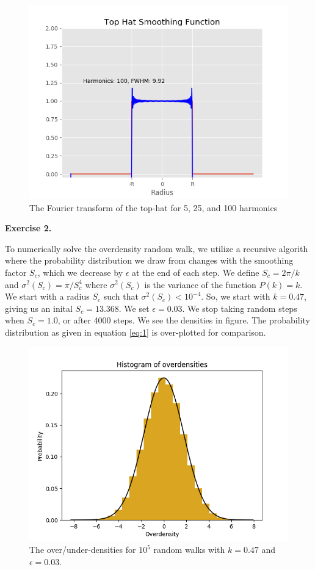 \documentclass[a4paper]{article}
\begin{document}
\begin{figure}[h]
\centering
\includegraphics[scale=0.45]{exercise1_100harm}
\caption{The Fourier transform of the top-hat for 5, 25, and 100 harmonics}
\label{fig:mesh1}
\end{figure}

\clearpage

\textbf{Exercise 2.}

To numerically solve the overdensity random walk, we utilize a recursive algorith where the probability distribution we draw from changes with the smoothing factor $S_c$, which we decrease by $\epsilon$ at the end of each step.  We define $S_c = 2 \pi / k$ and $\sigma^2(S_c) = \pi / S_c^4$ where $\sigma^2(S_c)$ is the variance of the function $P(k)=k$. We start with a radius $S_c$ such that $\sigma^2(S_c) < 10^{-4}$. So, we start with $k = 0.47$, giving us an inital $S_c = 13.368$. We set $\epsilon = 0.03$. We stop taking random steps when $S_c = 1.0$, or after 4000 steps. We see the densities in figure. The probability distribution as given in equation \ref{eq:1} is over-plotted for comparison.

\begin{figure}[h]
\centering
\includegraphics[scale=0.475]{densityhisto}
\caption{The over/under-densities for $10^5$ random walks with $k=0.47$ and $\epsilon = 0.03$.}
\end{figure}
\end{document}
